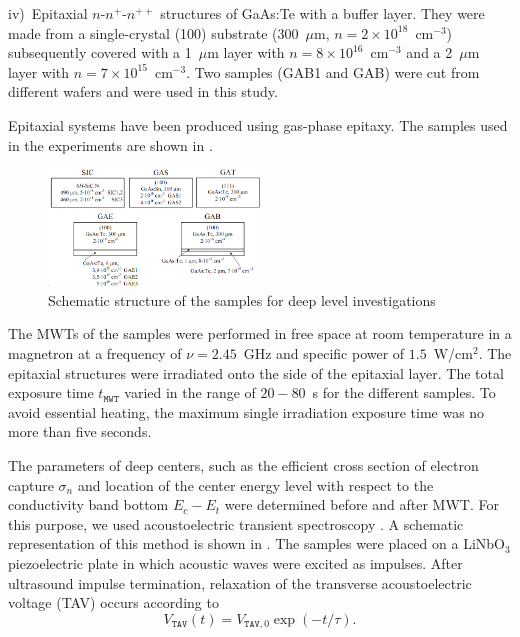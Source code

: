 \documentclass[10pt]{iopart}
\begin{document}
\noindent
iv)~Epitaxial $n$-$n^+$-$n^{++}$ structures of GaAs:Te with a buffer layer.
 They were made from a single-crystal (100) substrate (300~$\mu$m, $n= 2\times10^{18}$~cm$^{-3}$)
  subsequently covered with a 1~$\mu$m layer with $n=8\times10^{16}$~cm$^{-3}$ and
  a 2~$\mu$m layer with $n=7\times10^{15}$~cm$^{-3}$.
  Two samples (GAB1 and GAB) were cut from different wafers and were used in this study.

Epitaxial systems have been produced using gas-phase epitaxy.
The samples used in the experiments are shown in .

\begin{figure}
\includegraphics[width=0.5\textwidth]{Fig1}
\caption{\label{figSamp_TAV}
Schematic structure of the samples for deep level investigations
}%
\end{figure}

The MWTs of the samples were performed in free space at room temperature in a magnetron at a frequency of  $\nu=2.45$~GHz
and specific power of $1.5$~W/cm$^{2}$.
The epitaxial structures were irradiated onto the side of the epitaxial layer.
The total exposure time $t_\mathtt{MWT}$ varied in the range of $20-80$~s for the different samples.
To avoid essential heating, the maximum single irradiation exposure time was no more than  five seconds.


The parameters of deep centers, such as the efficient cross section of electron capture $\sigma_n$
and location of the center energy level with respect to the conductivity band bottom $E_c-E_t$ were determined before and after MWT.
For this purpose, we used acoustoelectric transient spectroscopy \cite{OstrovPAN,OlikhSSC,PANnewEn,OstrovskiiSST}.
A schematic representation of this method is shown in .
The samples were placed on a LiNbO$_3$ piezoelectric plate in which acoustic waves were excited as impulses.
After ultrasound impulse termination, relaxation of the transverse  acoustoelectric voltage (TAV) occurs according to
\begin{equation}\label{eqVtav}
  V_\mathtt{TAV}(t)=V_{\mathtt{TAV},0}\exp(-t/\tau).
\end{equation}
\end{document}
